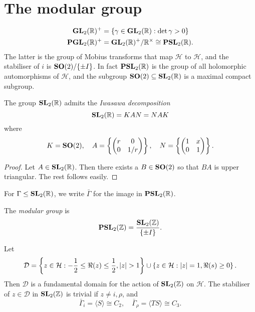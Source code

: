 \documentclass{memoir}
\begin{document}
\chapter{The modular group}
\begin{definition}
    \begin{align}
        \mathbf{GL}_2(\mathbb{R})^+ &= \{\gamma\in \mathbf{GL}_2(\mathbb{R}):\det\gamma>0\} \\
        \mathbf{PGL}_2(\mathbb{R})^+ &= \mathbf{GL}_2(\mathbb{R})^+/\mathbb{R}^\times \cong \mathbf{PSL}_2(\mathbb{R}).
    \end{align}
    The latter is the group of Mobius transforms that map $\mathcal H$ to $\mathcal H$, and the stabiliser of $i$ is $\mathbf{SO}(2)/\{\pm I\}$.
    In fact $\mathbf{PSL}_2(\mathbb{R})$ is the group of all holomorphic automorphisms of $\mathcal H$, and the subgroup $\mathbf{SO}(2)\subseteq \mathbf{SL}_2(\mathbb{R})$ is a maximal compact subgroup.
\end{definition}
\begin{thm}
    The group $\mathbf{SL}_2(\mathbb{R})$ admits the \textit{Iwasawa decomposition}
    \begin{equation}
        \mathbf{SL}_2(\mathbb{R}) = KAN = NAK
    \end{equation}
    where 
    \begin{equation}
    K = \mathbf{SO}(2), \quad A = \left\{\begin{pmatrix}r & 0 \\ 0 & 1/r\end{pmatrix}\right\}, \quad N = \left\{\begin{pmatrix}1 & x \\ 0 & 1\end{pmatrix}\right\}.
    \end{equation}
\end{thm}
\begin{proof}
    Let $A\in\mathbf{SL}_2(\mathbb{R})$. 
    Then there exists a $B\in\mathbf{SO}(2)$ so that $BA$ is upper triangular. The rest follows easily.
\end{proof}
\begin{definition}
    For $\Gamma \le \mathbf{SL}_2(\mathbb{R})$, we write $\bar \Gamma$ for the image in $\mathbf{PSL}_2(\mathbb{R})$.
\end{definition}
\begin{definition}
    The \textit{modular group} is 
    \begin{equation}
        \mathbf{PSL}_2(\mathbb{Z}) = \frac{\mathbf{SL}_2(\mathbb{Z})}{\{\pm I\}}.
    \end{equation}
\end{definition}
\begin{thm}
    Let
    \begin{equation}
        \mathcal D = \left\{z\in \mathcal H: -\frac12 \le \Re(z) \le \frac12, \lvert z\rvert>1\right\} \cup \left\{z\in \mathcal H: \lvert z\rvert = 1, \Re(s) \ge 0\right\}.
    \end{equation}
    Then $\mathcal D$ is a fundamental domain for the action of $\mathbf{SL}_2(\mathbb{Z})$ on $\mathcal H$.
    The stabiliser of $z\in \mathcal D$ in $\mathbf{SL}_2(\mathbb{Z})$ is trivial if $z\ne i,\rho$, and 
    \begin{equation}
        \bar \Gamma_i = \langle S \rangle \cong C_2, \quad \bar \Gamma_\rho = \langle TS \rangle \cong C_3.
    \end{equation}
\end{thm}
\end{document}
